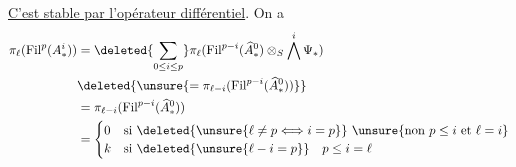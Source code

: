 \uline{C'est stable par l'opérateur différentiel}.
On a 
\[
\begin{aligned}
\pi_\ell(\mathrm{Fil}^p(A_*^i))&=\deleted{\sum_{0\leq i\leq p}}\pi_\ell(\mathrm{Fil}^{p-i}(\widehat A_*^0)\otimes_S\bigwedge^i\Psi_*)\\
&\deleted{\unsure{=\pi_{\ell-i}(\mathrm{Fil}^{p-i}(\widehat A_*^0))}}\\
&=\pi_{\ell-i}(\mathrm{Fil}^{p-i}(\widehat A_*^0))\\
&=\begin{cases}0&\text{si }\deleted{\unsure{\ell\ne p\Longleftrightarrow i=p}}\ \unsure{\text{non }p\leq i\text{ et }\ell=i}\\k&\text{si }\deleted{\unsure{\ell-i=p}}\quad p\leq i=\ell\end{cases}
\end{aligned}
\]

